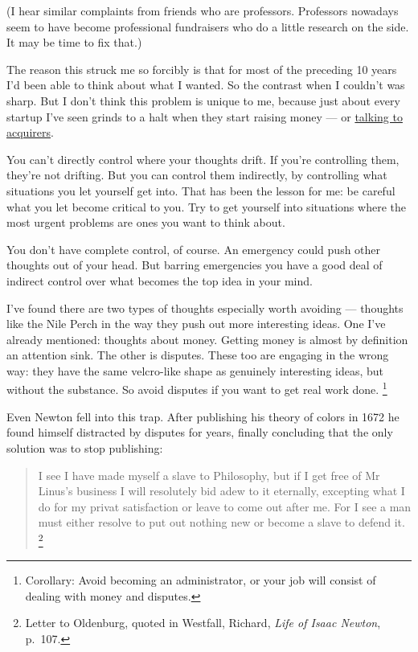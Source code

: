 \documentclass[12pt]{book}
\begin{document}
(I hear similar complaints from friends who are professors. Professors
nowadays seem to have become professional fundraisers who do a little
research on the side. It may be time to fix that.)

The reason this struck me so forcibly is that for most of the preceding
10 years I'd been able to think about what I wanted. So the contrast
when I couldn't was sharp. But I don't think this problem is unique to
me, because just about every startup I've seen grinds to a halt when
they start raising money --- or \href{corpdev.html}{talking to
acquirers}.

You can't directly control where your thoughts drift. If you're
controlling them, they're not drifting. But you can control them
indirectly, by controlling what situations you let yourself get into.
That has been the lesson for me: be careful what you let become critical
to you. Try to get yourself into situations where the most urgent
problems are ones you want to think about.

You don't have complete control, of course. An emergency could push
other thoughts out of your head. But barring emergencies you have a good
deal of indirect control over what becomes the top idea in your mind.

I've found there are two types of thoughts especially worth avoiding ---
thoughts like the Nile Perch in the way they push out more interesting
ideas. One I've already mentioned: thoughts about money. Getting money
is almost by definition an attention sink. The other is disputes. These
too are engaging in the wrong way: they have the same velcro-like shape
as genuinely interesting ideas, but without the substance. So avoid
disputes if you want to get real work done. \footnote{Corollary: Avoid becoming an administrator, or your job will
consist of dealing with money and disputes.}

Even Newton fell into this trap. After publishing his theory of colors
in 1672 he found himself distracted by disputes for years, finally
concluding that the only solution was to stop publishing:

\begin{quote}
I see I have made myself a slave to Philosophy, but if I get free of Mr
Linus's business I will resolutely bid adew to it eternally, excepting
what I do for my privat satisfaction or leave to come out after me. For
I see a man must either resolve to put out nothing new or become a slave
to defend it. \footnote{Letter to Oldenburg, quoted in Westfall, Richard, \emph{Life of
Isaac Newton}, p.~107.}
\end{quote}
\end{document}
